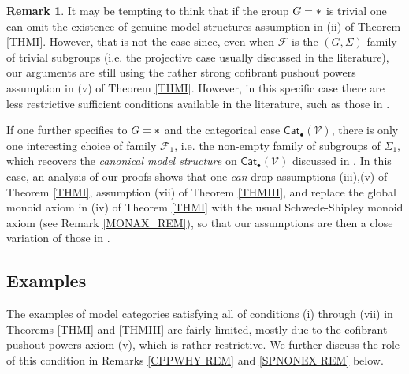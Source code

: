 \documentclass[a4paper,10pt
,draft
]{article}%
\numberwithin{equation}{section}
\numberwithin{figure}{section}
\theoremstyle{definition} %
\newtheorem{remark}[equation]{Remark}%
\newcommand{\Cat}{\mathsf{Cat}}
\newcommand{\F}{\ensuremath{\mathcal F}}
\newcommand{\V}{\ensuremath{\mathcal V}}
\newcommand{\1}{\ensuremath{\mathbbm 1}}%
\begin{document}
\begin{remark}\label{GTRIV REM}
	It may be tempting to think that if the group $G=\**$ is trivial
	one can omit the existence of genuine model structures assumption in (ii) of Theorem \ref{THMI}.
	However, that is not the case since, 
	even when $\F$ is the $(G,\Sigma)$-family of trivial subgroups
	(i.e. the projective case usually discussed in the literature),
	our arguments are still using the rather strong
	cofibrant pushout powers assumption in 
	(v) of Theorem \ref{THMI}.
	However, in this specific case 
	there are less restrictive sufficient conditions available in the literature, such as those in \cite[Thm. 1.1]{PS18}.

	If one further specifies to 
	$G=\**$ and the categorical case $\Cat_\bullet(\V)$,
	there is only one interesting choice of family $\F_1$,
	i.e. the non-empty family of subgroups of $\Sigma_1$,
	which recovers the \emph{canonical model structure} on 
	$\Cat_\bullet(\V)$ discussed in \cite{BM13}.
	In this case, an analysis of our proofs shows that
	one \emph{can}
	drop assumptions (iii),(v) of Theorem \ref{THMI},
	assumption (vii) of Theorem \ref{THMIII},
	and replace the global monoid axiom in (iv) 
	of Theorem \ref{THMI}
	with the usual Schwede-Shipley
	monoid axiom \cite{SS00}
	(see Remark \ref{MONAX_REM}),
	so that our assumptions are then a close variation of those in \cite{BM13}.
\end{remark}





\subsection{Examples}



The examples of 
model categories satisfying 
all of conditions (i) through (vii)
in Theorems \ref{THMI} and \ref{THMIII}
are fairly limited, 
mostly due to 
the cofibrant pushout powers axiom (v),
which is rather restrictive.
We further discuss the role of this condition 
in Remarks 
\ref{CPPWHY REM} and
\ref{SPNONEX REM} below.
\end{document}
